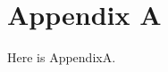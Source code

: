 \documentclass[
    ref = ./chapters/ref.bib,
    coverpage = ./chapters/coverpage.tex,
    geometry = b5,
    lang = en,
]{spBook}
\date{\today}
\begin{document}
    \newcommand{\inputChapter}[1]{}

    \frontmatter
    \maketitle
    \tableofcontents
    \inputChapter{preface}

    \mainmatter

    \backmatter
    \chapter{Appendix A}
    Here is AppendixA.\lipsum[1-5]
\end{document}
